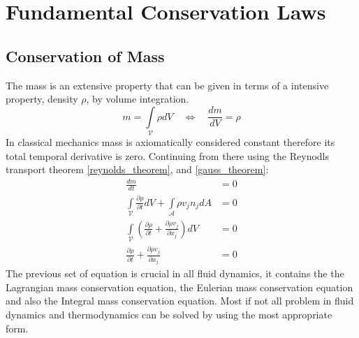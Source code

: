 \chapter{Fundamental Conservation Laws}
\label{fundamentals}



\section{Conservation of Mass}
The mass is an extensive property that can be given in terms of a intensive property, density $\rho$, by volume integration.
\begin{equation}
m=\int\limits_{\mathcal{V}}\rho dV  \quad  \Leftrightarrow \quad  \frac{dm}{dV}= \rho
\end{equation}
In classical mechanics mass is axiomatically considered constant therefore its total temporal derivative is zero. Continuing from there using the Reynodls transport theorem \eqref{reynolds_theorem}, and \eqref{gauss_theorem}:
\begin{align}
    \frac{dm}{dt} &= 0\\
    \int\limits_{\mathcal{V}} \frac{\partial \rho}{\partial t} dV + \int\limits_{\mathcal{A}} \rho v_j n_j dA &= 0 \\
    \int\limits_{\mathcal{V}} \left(\frac{\partial \rho}{\partial t} + \frac{\partial \rho v_j}{\partial x_j} \right) dV  &= 0 \\
    \frac{\partial \rho}{\partial t} +  \frac{\partial \rho v_j}{\partial x_j} &= 0
\end{align}
The previous set of equation is crucial in all fluid dynamics, it contains the the Lagrangian mass conservation equation, the Eulerian mass conservation equation and also the Integral mass conservation equation. Most if not all problem in fluid dynamics and thermodynamics can be solved by using the most appropriate form.

